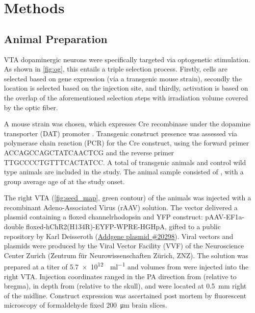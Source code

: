 \section{Methods}

\subsection{Animal Preparation}

VTA dopaminergic neurons were specifically targeted via optogenetic stimulation.
As shown in \cref{fig:og}, this entails a triple selection process.
Firstly, cells are selected based on gene expression (via a transgenic mouse strain), secondly the location is selected based on the injection site, and thirdly, activation is based on the overlap of the aforementioned selection steps with irradiation volume covered by the optic fiber.

A mouse strain was chosen, which expresses Cre recombinase under the dopamine transporter (DAT) promoter \cite{dat}.
Transgenic construct presence was assessed via polymerase chain reaction (PCR) for the Cre construct, using the forward primer ACCAGCCAGCTATCAACTCG and the reverse primer TTGCCCCTGTTTCACTATCC.
A total of  transgenic animals and  control wild type animals are included in the study.
The animal sample consisted of , with a group average age of  at the study onset.

The right VTA (\cref{fig:seed_map}, green contour) of the animals was injected with a recombinant Adeno-Associated Virus (rAAV) solution.
The vector delivered a plasmid containing a floxed channelrhodopsin and YFP construct:
pAAV-EF1a-double floxed-hChR2(H134R)-EYFP-WPRE-HGHpA, gifted to a public repository by Karl Deisseroth (\href{https://www.addgene.org/20298/}{Addgene plasmid \#20298}).
Viral vectors and plasmids were produced by the Viral Vector Facility (VVF) of the Neuroscience Center Zurich (Zentrum für Neurowissenschaften Zürich, ZNZ).
The solution was prepared at a titer of \SI{5.7e12}{\vg\per\milli\litre} and volumes from
were injected into the right VTA.
Injection coordinates ranged in the PA direction from
 (relative to bregma),
in depth from
 (relative to the skull),
and were located at \SI{0.5}{\milli\meter} right of the midline.
Construct expression was ascertained post mortem by fluorescent microscopy of formaldehyde fixed \SI{200}{\micro\metre} brain slices.

